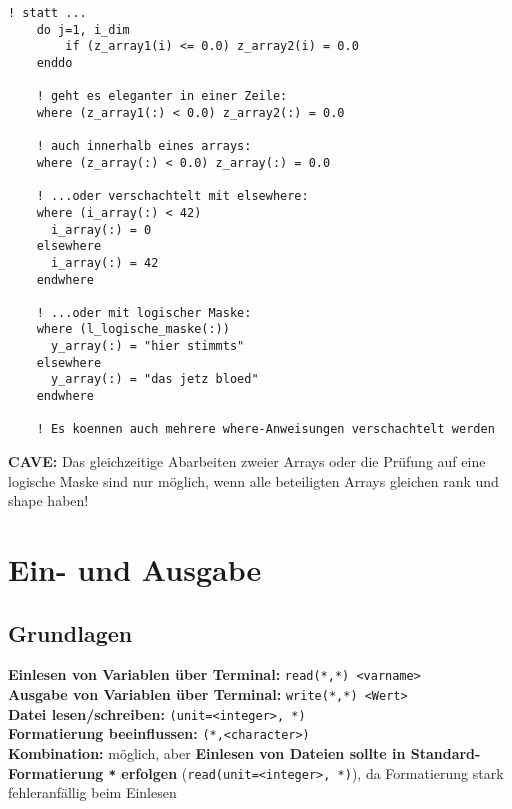 \documentclass[a4paper, twocolumn]{scrarticle}
\begin{document}
\begin{lstlisting}[caption={\bfseries where-Statement als Ersatz für do-if in Feldern},language=Fortran95Konkret]
	! statt ...
	do j=1, i_dim
		if (z_array1(i) <= 0.0) z_array2(i) = 0.0
	enddo
	
	! geht es eleganter in einer Zeile:
	where (z_array1(:) < 0.0) z_array2(:) = 0.0
	
	! auch innerhalb eines arrays:
	where (z_array(:) < 0.0) z_array(:) = 0.0
	
	! ...oder verschachtelt mit elsewhere:
	where (i_array(:) < 42)
	  i_array(:) = 0
	elsewhere
	  i_array(:) = 42
	endwhere
	
	! ...oder mit logischer Maske:
	where (l_logische_maske(:))
	  y_array(:) = "hier stimmts"
	elsewhere
	  y_array(:) = "das jetz bloed"
	endwhere
	
	! Es koennen auch mehrere where-Anweisungen verschachtelt werden
\end{lstlisting}
\textbf{CAVE:} Das gleichzeitige Abarbeiten zweier Arrays oder die Prüfung auf eine logische Maske sind nur möglich, wenn alle beteiligten Arrays gleichen rank und shape haben!

\section{Ein- und Ausgabe}
\subsection{Grundlagen}
\textbf{Einlesen von Variablen über Terminal:} \lstinline|read(*,*) <varname>|\\
\textbf{Ausgabe von Variablen über Terminal:} \lstinline|write(*,*) <Wert>|\\
\textbf{Datei lesen/schreiben:} \lstinline|(unit=<integer>, *)|\\
\textbf{Formatierung beeinflussen:} \lstinline|(*,<character>)|\\
\textbf{Kombination:} möglich, aber \textbf{Einlesen von Dateien sollte in Standard-Formatierung \lstinline|*| erfolgen} (\lstinline|read(unit=<integer>, *)|), da Formatierung stark fehleranfällig beim Einlesen
\end{document}
